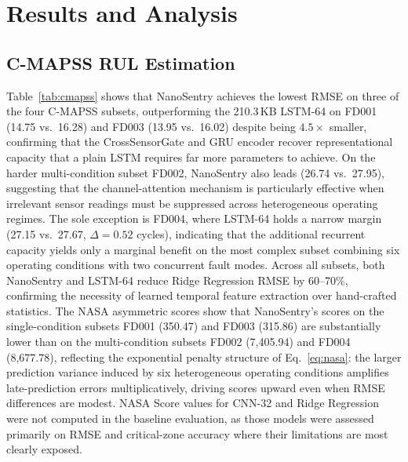 \documentclass[AMA,Times1COL]{WileyNJDv5}
\begin{document}
\section{Results and Analysis}
\label{sec:results}

\subsection{C-MAPSS RUL Estimation}
\label{sec:results:cmapss}

Table~\ref{tab:cmapss} shows that NanoSentry achieves the lowest RMSE
on three of the four C-MAPSS subsets, outperforming the 210.3\,KB
LSTM-64 on FD001 (14.75 vs.\ 16.28) and FD003 (13.95 vs.\ 16.02)
despite being $4.5{\times}$ smaller, confirming that the CrossSensorGate
and GRU encoder recover representational capacity that a plain LSTM
requires far more parameters to achieve.
On the harder multi-condition subset FD002, NanoSentry also leads
(26.74 vs.\ 27.95), suggesting that the channel-attention mechanism
is particularly effective when irrelevant sensor readings must be
suppressed across heterogeneous operating regimes.
The sole exception is FD004, where LSTM-64 holds a narrow margin
(27.15 vs.\ 27.67, $\Delta{=}0.52$ cycles), indicating that the
additional recurrent capacity yields only a marginal benefit on the
most complex subset combining six operating conditions with two
concurrent fault modes.
Across all subsets, both NanoSentry and LSTM-64 reduce Ridge
Regression RMSE by 60--70\%, confirming the necessity of learned
temporal feature extraction over hand-crafted statistics.
The NASA asymmetric scores show that NanoSentry's scores on the
single-condition subsets FD001 (350.47) and FD003 (315.86) are
substantially lower than on the multi-condition subsets FD002
(7{,}405.94) and FD004 (8{,}677.78), reflecting the exponential
penalty structure of Eq.~\ref{eq:nasa}: the larger prediction variance
induced by six heterogeneous operating conditions amplifies
late-prediction errors multiplicatively, driving scores upward even
when RMSE differences are modest.
NASA Score values for CNN-32 and Ridge Regression were not computed
in the baseline evaluation, as those models were assessed primarily
on RMSE and critical-zone accuracy where their limitations are most
clearly exposed.
\end{document}
